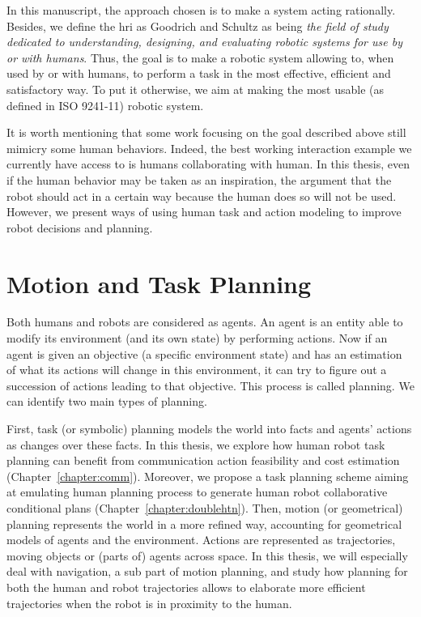 \documentclass[a4paper,11pt,twoside]{StyleThese}
\begin{document}
In this manuscript, the approach chosen is to make a system acting rationally. Besides, we define the \acrfull{hri} as Goodrich and Schultz as being \textit{the field of study dedicated to understanding, designing, and evaluating robotic systems for use by or with humans}. Thus, the goal is to make a robotic system allowing to, when used by or with humans, to perform a task in the most effective, efficient and satisfactory way. To put it otherwise, we aim at making the most usable (as defined in ISO 9241-11) robotic system.

It is worth mentioning that some work focusing on the goal described above still mimicry some human behaviors. Indeed, the best working interaction example we currently have access to is humans collaborating with human. In this thesis, even if the human behavior may be taken as an inspiration, the argument that the robot should act in a certain way because the human does so will not be used. However, we present ways of using human task and action modeling to improve robot decisions and planning.



\section*{Motion and Task Planning}
Both humans and robots are considered as agents. An agent is an entity able to modify its environment (and its own state) by performing actions. Now if an agent is given an objective (a specific environment state) and has an estimation of what its actions will change in this environment, it can try to figure out a succession of actions leading to that objective. This process is called planning. We can identify two main types of planning. 

First, task (or symbolic) planning models the world into facts and agents' actions as changes over these facts. In this thesis, we explore how human robot task planning can benefit from communication action feasibility and cost estimation (Chapter~\ref{chapter:comm}). Moreover, we propose a task planning scheme aiming at emulating human planning process to generate human robot collaborative conditional plans (Chapter~\ref{chapter:doublehtn}). Then, motion (or geometrical) planning represents the world in a more refined way, accounting for geometrical models of agents and the environment. Actions are represented as trajectories, moving objects or (parts of) agents across space. In this thesis, we will especially deal with navigation, a sub part of motion planning, and study how planning for both the human and robot trajectories allows to elaborate more efficient trajectories when the robot is in proximity to the human.
\end{document}
